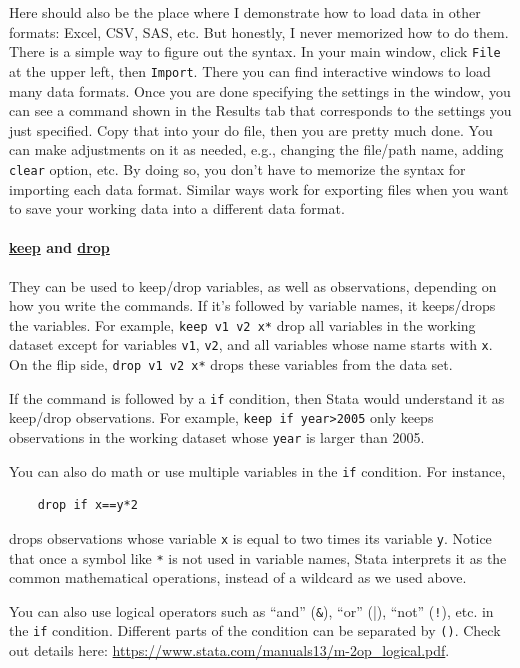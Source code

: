 Here should also be the place where I demonstrate how to load data in other formats: Excel, CSV, SAS, etc. But honestly, I never memorized how to do them. There is a simple way to figure out the syntax. In your main window, click \verb|File| at the upper left, then \verb|Import|. There you can find interactive windows to load many data formats. Once you are done specifying the settings in the window, you can see a command shown in the Results tab that corresponds to the settings you just specified. Copy that into your do file, then you are pretty much done. You can make adjustments on it as needed, e.g., changing the file/path name, adding \verb|clear| option, etc. By doing so, you don't have to memorize the syntax for importing each data format. Similar ways work for exporting files when you want to save your working data into a different data format. 

\paragraph{\underline{keep} and  \underline{drop}} They can be used to keep/drop variables, as well as observations, depending on how you write the commands. If it's followed by variable names, it keeps/drops the variables. For example, \verb|keep v1 v2 x*| drop all variables in the working dataset except for variables \verb|v1|, \verb|v2|, and all variables whose name starts with \verb|x|. On the flip side, \verb|drop v1 v2 x*| drops these variables from the data set. 

If the command is followed by a \verb|if| condition, then Stata would understand it as keep/drop observations. For example, \verb|keep if year>2005| only keeps observations in the working dataset whose \verb|year| is larger than 2005. 

You can also do math or use multiple variables in the \verb|if| condition. For instance, 
\begin{verbatim}
    drop if x==y*2
\end{verbatim}
drops observations whose variable \verb|x| is equal to two times its variable \verb|y|. Notice that once a symbol like \verb|*| is not used in variable names, Stata interprets it as the common mathematical operations, instead of a wildcard as we used above. 

You can also use logical operators such as ``and'' (\verb|&|), ``or'' (\verb|||), ``not'' (\verb|!|), etc. in the \verb|if| condition. Different parts of the condition can be separated by \verb|()|. Check out details here: \url{https://www.stata.com/manuals13/m-2op_logical.pdf}.
